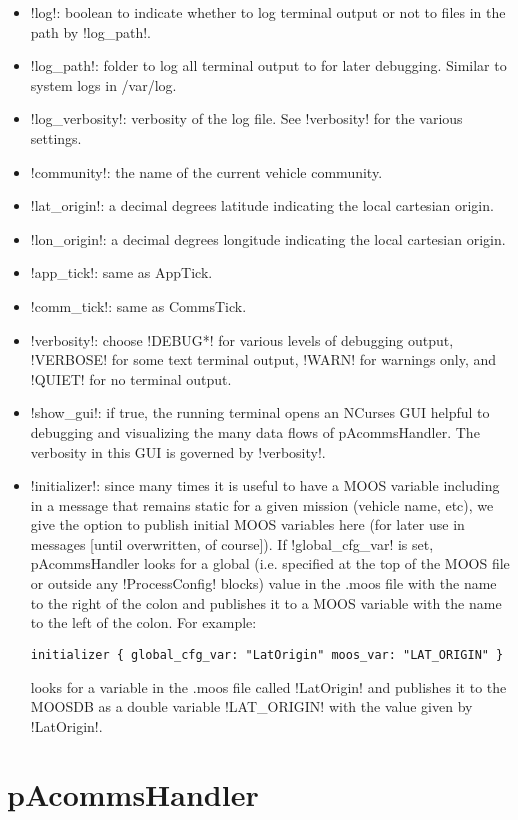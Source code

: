 \begin{itemize}
\item !log!: boolean to indicate whether to log terminal output or not to files in the path by !log_path!.
\item !log_path!: folder to log all terminal output to for later debugging. Similar to system logs in /var/log.
\item !log_verbosity!: verbosity of the log file. See !verbosity! for the various settings.
\item !community!: the name of the current vehicle community.
\item !lat_origin!: a decimal degrees latitude indicating the local cartesian origin.
\item !lon_origin!: a decimal degrees longitude indicating the local cartesian origin.
\item !app_tick!: same as AppTick.
\item !comm_tick!: same as CommsTick.
\item !verbosity!: choose !DEBUG*! for various levels of debugging output, !VERBOSE! for some text terminal output, !WARN! for warnings only, and !QUIET! for no terminal output.
\item !show_gui!: if true, the running terminal opens an NCurses GUI helpful to debugging and visualizing the many data flows of pAcommsHandler. The verbosity in this GUI is governed by !verbosity!.
\item !initializer!: since many times it is useful to have a MOOS variable including in a message that remains static for a given mission (vehicle name, etc), we give the option to publish initial MOOS variables here (for later use in messages [until overwritten, of course]). If !global_cfg_var! is set, pAcommsHandler looks for a global (i.e. specified at the top of the MOOS file or outside any !ProcessConfig! blocks) value in the .moos file with the name to the right of the colon and publishes it to a MOOS variable with the name to the left of the colon. For example:
\begin{verbatim}
initializer { global_cfg_var: "LatOrigin" moos_var: "LAT_ORIGIN" } 
\end{verbatim}
\resetbvlinenumber
looks for a variable in the .moos file called !LatOrigin! and publishes it to the MOOSDB as a double variable !LAT_ORIGIN! with the value given by !LatOrigin!.
\end{itemize}


\section{pAcommsHandler}
\label{sec:pacommshandler} 

